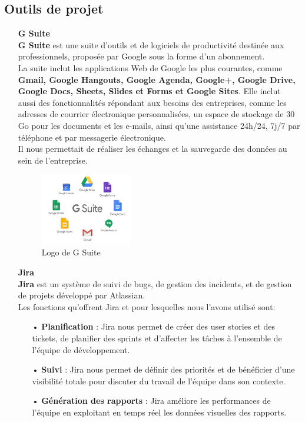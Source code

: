 \documentclass[12pt]{report}
\begin{document}
	  \subsection{Outils de projet}
	    \begin{itemize}
	      \item[\ding{42}] \textbf{G Suite}\\
		\textbf{G Suite} est une suite d'outils et de logiciels de productivité destinée aux professionnels, proposée par Google sous la forme d'un abonnement.
		\\La suite inclut les applications Web de Google les plus courantes, comme \textbf{Gmail, Google Hangouts, Google Agenda, Google+, Google Drive, Google Docs, Sheets, Slides et Forms et Google Sites}. Elle inclut aussi des fonctionnalités répondant aux besoins des entreprises, comme les adresses de courrier électronique personnalisées, un espace de stockage de 30 Go pour les documents et les e-mails, ainsi qu'une assistance 24h/24, 7j/7 par téléphone et par messagerie électronique.\cite{g_suite}
		\\Il nous permettait de réaliser les échanges et la sauvegarde des données au sein de l'entreprise.
		
		\begin{figure}[H]
		  \begin{center}
		    \includegraphics[scale=0.4, width=4cm]{images/logoGsuite.png}
		    \caption{Logo de G Suite}
		  \end{center}
		\end{figure}

	      \item[\ding{42}] \textbf{Jira}\\
		\textbf{Jira} est un système de suivi de bugs, de gestion des incidents, et de gestion de projets développé par Atlassian.\cite{jira}
		\\Les fonctions qu'offrent Jira et pour lesquelles nous l'avons utilisé sont:
		\begin{itemize}
		  \item[•] \textbf{Planification} : Jira nous permet de créer des user stories et des tickets, de planifier des sprints et d'affecter les tâches à l'ensemble de l'équipe de développement.
		  \item[•] \textbf{Suivi} : Jira nous permet de définir des priorités et de bénéficier d'une visibilité totale pour discuter du travail de l'équipe dans son contexte.
		  \item[•] \textbf{Génération des rapports} : Jira améliore les performances de l'équipe en exploitant en temps réel les données visuelles des rapports.
		\end{itemize}
		

\end{itemize}
\end{document}
